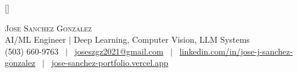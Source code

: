 \raggedbottom
\raggedright
\setlength{\tabcolsep}{0in}

\titleformat{\section}{
  \vspace{-11pt}\scshape\raggedright\large\bfseries
}{}{0em}{}[\color{black}\titlerule \vspace{-8pt}]


\newcommand{\resumeItem}[1]{
  \item\small{#1 \vspace{-1pt}}
}

\newcommand{\resumeSubheading}[4]{
  \vspace{-2pt}\item
    \begin{tabular*}{\textwidth}[t]{l@{\extracolsep{\fill}}r}
      \textbf{#1} & \textbf{\small #2} \\
      \textit{\small#3} & \textit{\small #4} \\
    \end{tabular*}\vspace{-6pt}
}

\newcommand{\resumeProjectHeading}[2]{
    \item
    \begin{tabular*}{\textwidth}{l@{\extracolsep{\fill}}r}
      \small#1 & \textbf{\small #2}\\
    \end{tabular*}\vspace{-5pt}
}

\newcommand{\resumeSubHeadingListStart}{\begin{itemize}[leftmargin=0.0in, label={}, itemsep=1pt]}
\newcommand{\resumeSubHeadingListEnd}{\end{itemize}\vspace{-1pt}}
\newcommand{\resumeItemListStart}{\begin{itemize}[leftmargin=0.15in, itemsep=1pt, topsep=2pt, parsep=0pt]}
\newcommand{\resumeItemListEnd}{\end{itemize}\vspace{-2pt}}



\begin{center}
    {\Huge \scshape Jose Sanchez Gonzalez} \\ \vspace{3pt}
    \small AI/ML Engineer $|$ Deep Learning, Computer Vision, LLM Systems \\ \vspace{3pt}
    \small (503) 660-9763 ~$|$~
    \href{mailto:joseszgz2021@gmail.com}{joseszgz2021@gmail.com} ~$|$~
    \href{https://linkedin.com/in/jose-j-sanchez-gonzalez-84a800257/}{linkedin.com/in/jose-j-sanchez-gonzalez} ~$|$~
    \href{https://jose-sanchez-portfolio-com.vercel.app/}{jose-sanchez-portfolio.vercel.app}
\end{center}
\vspace{-12pt}

